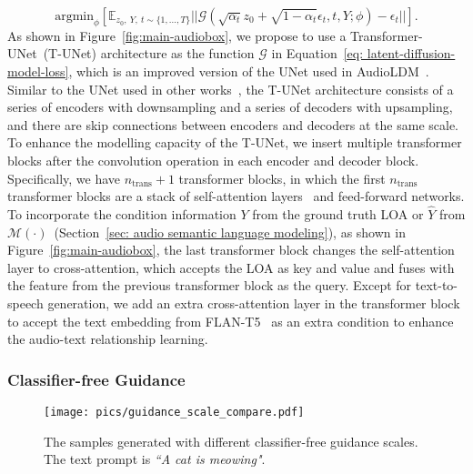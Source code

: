 \documentclass[lettersize,journal]{IEEEtran}
\begin{document}
\begin{equation}
    \label{eq: latent-diffusion-model-loss}
    \text{argmin}_{\phi}[\mathbb{E}_{z_0,~Y,~t\sim \{1,...,T\}}|| \mathcal{G}(\sqrt{\alpha_{t}}z_0+\sqrt{1-\alpha_{t}}\epsilon_t, t, Y; \phi)-\epsilon_t ||].
\end{equation}
As shown in Figure~\ref{fig:main-audiobox}, we propose to use a Transformer-UNet~(T-UNet) architecture as the function $\mathcal{G}$ in Equation~\eqref{eq: latent-diffusion-model-loss}, which is an improved version of the UNet used in AudioLDM~\cite{liu2023audioldm}. Similar to the UNet used in other works~\cite{kong2021decoupling}, the T-UNet architecture consists of a series of encoders with downsampling and a series of decoders with upsampling, and there are skip connections between encoders and decoders at the same scale. To enhance the modelling capacity of the T-UNet, we insert multiple transformer blocks after the convolution operation in each encoder and decoder block. Specifically, we have $n_{\text{trans}}+1$ transformer blocks, in which the first $n_{\text{trans}}$ transformer blocks are a stack of self-attention layers~\cite{vaswani2017attention-is-all-you-need} and feed-forward networks. To incorporate the condition information $Y$ from the ground truth LOA or $\hat{Y}$ from $\mathcal{M}(\cdot)$~(Section~\ref{sec: audio semantic language modeling}), as shown in Figure~\ref{fig:main-audiobox}, the last transformer block changes the self-attention layer to cross-attention, which accepts the LOA as key and value and fuses with the feature from the previous transformer block as the query. Except for text-to-speech generation, we add an extra cross-attention layer in the transformer block to accept the text embedding from FLAN-T5~\cite{chung2022scaling-flan-t5} as an extra condition to enhance the audio-text relationship learning. 



\subsubsection{Classifier-free Guidance}
\label{CFG}

\begin{figure}[htbp]
    \centering
    \texttt{[image: pics/guidance\_scale\_compare.pdf]}
    \caption{The samples generated with different classifier-free guidance scales. The text prompt is \textit{``A cat is meowing"}.}
    \label{fig:my_label}
\end{figure}
\end{document}
